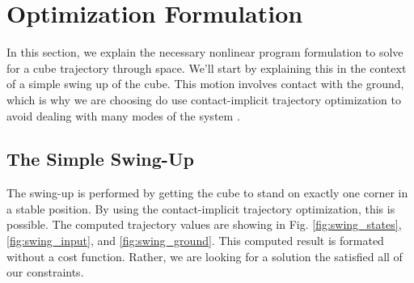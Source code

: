 \documentclass[conference]{IEEEtran}
\begin{document}
\section{Optimization Formulation}
In this section, we explain the necessary nonlinear program formulation to solve for a cube trajectory through space. We'll start by explaining this in the context of a simple swing up of the cube. This motion involves contact with the ground, which is why we are choosing do use contact-implicit trajectory optimization to avoid dealing with many modes of the system \cite{b1}.

\subsection{The Simple Swing-Up}
The swing-up is performed by getting the cube to stand on exactly one corner in a stable position. By using the contact-implicit trajectory optimization, this is possible. The computed trajectory values are showing in Fig. \ref{fig:swing_states}, \ref{fig:swing_input}, and \ref{fig:swing_ground}. This computed result is formated without a cost function. Rather, we are looking for a solution the satisfied all of our constraints.
\end{document}
